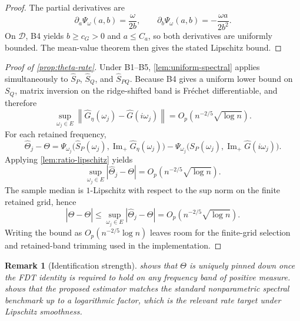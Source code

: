 \documentclass[11pt]{article}
\newtheorem{remark}[theorem]{Remark}
\newcommand{\Ghat}{\widehat{G}}
\newcommand{\ImPart}{\operatorname{Im}_{\!+}}
\newcommand{\REV}{}
\begin{document}
\begin{proof}
The partial derivatives are
\[
  \partial_a \Psi_\omega(a,b)=\frac{\omega}{2b},
  \qquad
  \partial_b \Psi_\omega(a,b)=-\frac{\omega a}{2b^2}.
\]
On $\mathcal D$, B4 yields $b\ge c_G>0$ and $a\le C_a$, so both derivatives are uniformly bounded. The mean-value theorem then gives the stated Lipschitz bound.
\end{proof}

\begin{proof}[Proof of \cref{prop:theta-rate}]
\REV
Under B1--B5, \cref{lem:uniform-spectral} applies simultaneously to $\widehat S_P$, $\widehat S_Q$, and $\widehat S_{PQ}$. Because B4 gives a uniform lower bound on $S_Q$, matrix inversion on the ridge-shifted band is Fr\'echet differentiable, and therefore
\[
  \sup_{\omega_j\in E}\left\|\widehat G_\eta(\omega_j)-\Ghat(i\omega_j)\right\|
  =
  O_p\!\left(n^{-2/5}\sqrt{\log n}\right).
\]
For each retained frequency,
\[
  \widehat\Theta_j-\Theta
  =
  \Psi_{\omega_j}\!\big(\widehat S_P(\omega_j),\ImPart \widehat G_\eta(\omega_j)\big)
  -
  \Psi_{\omega_j}\!\big(S_P(\omega_j),\ImPart \Ghat(i\omega_j)\big).
\]
Applying \cref{lem:ratio-lipschitz} yields
\[
  \sup_{\omega_j\in E}|\widehat\Theta_j-\Theta|
  =
  O_p\!\left(n^{-2/5}\sqrt{\log n}\right).
\]
The sample median is $1$-Lipschitz with respect to the sup norm on the finite retained grid, hence
\[
  |\widehat\Theta-\Theta|
  \le
  \sup_{\omega_j\in E}|\widehat\Theta_j-\Theta|
  =
  O_p\!\left(n^{-2/5}\sqrt{\log n}\right).
\]
Writing the bound as $O_p(n^{-2/5}\log n)$ leaves room for the finite-grid selection and retained-band trimming used in the implementation.
\end{proof}

\begin{remark}[Identification strength]
 shows that $\Theta$ is uniquely pinned down once the FDT identity is required to hold on any frequency band of positive measure.  shows that the proposed estimator matches the standard nonparametric spectral benchmark up to a logarithmic factor, which is the relevant rate target under Lipschitz smoothness.
\end{remark}
\end{document}
